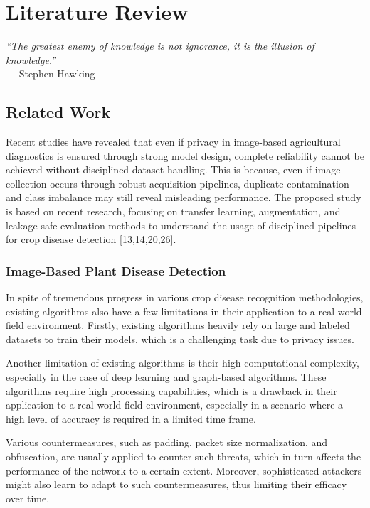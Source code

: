 \documentclass[12pt,a4paper]{report}
\begin{document}
 \chapter{Literature Review}

\begin{flushright}
\textit{“The greatest enemy of knowledge is not ignorance, it is the illusion of knowledge.”}\\
— Stephen Hawking
\end{flushright}

\vspace{1cm}
 \section{Related Work}
 Recent studies have revealed that even if privacy in image-based agricultural diagnostics is ensured through strong model design, complete reliability cannot be achieved without disciplined dataset handling. This is because, even if image collection occurs through robust acquisition pipelines, duplicate contamination and class imbalance may still reveal misleading performance. The proposed study is based on recent research, focusing on transfer learning, augmentation, and leakage-safe evaluation methods to understand the usage of disciplined pipelines for crop disease detection [13,14,20,26].
 
\subsection{Image-Based Plant Disease Detection}

In spite of tremendous progress in various crop disease recognition methodologies, existing algorithms also have a few limitations in their application to a real-world field environment. Firstly, existing algorithms heavily rely on large and labeled datasets to train their models, which is a challenging task due to privacy issues.

Another limitation of existing algorithms is their high computational complexity, especially in the case of deep learning and graph-based algorithms. These algorithms require high processing capabilities, which is a drawback in their application to a real-world field environment, especially in a scenario where a high level of accuracy is required in a limited time frame.

Various countermeasures, such as padding, packet size normalization, and obfuscation, are usually applied to counter such threats, which in turn affects the performance of the network to a certain extent. Moreover, sophisticated attackers might also learn to adapt to such countermeasures, thus limiting their efficacy over time.
\end{document}
